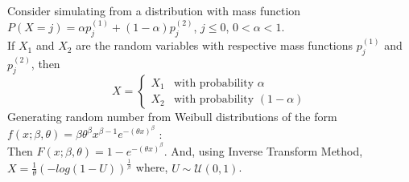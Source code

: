 \documentclass[11pt]{article}
\begin{document}
Consider simulating from a distribution with mass function $P(X=j) = \alpha p_{j}^{(1)} + (1 - \alpha) p_{j}^{(2)}$, $j \leq 0$, $0 < \alpha < 1$.\\
If $X_1$ and $X_2$ are the random variables with respective mass functions $p_{j}^{(1)}$ and $p_{j}^{(2)}$, then
$$X = \begin{cases} X_1 & \text{with probability $\alpha$} \\ X_2 & \text{with probability $(1 - \alpha)$} \end{cases}$$
Generating random number from Weibull distributions of the form $f(x;\beta,\theta) = \beta\theta^{\beta}x^{\beta-1}e^{-(\theta x)^{\beta}}$ :\\
Then $F(x;\beta,\theta) = 1 - e^{-(\theta x)^{\beta}}$.
And, using Inverse Transform Method, $X = \frac{1}{\theta}(-log(1-U))^{\frac{1}{\beta}}$ where, $U \sim \mathcal{U}(0,1)$.
\end{document}
